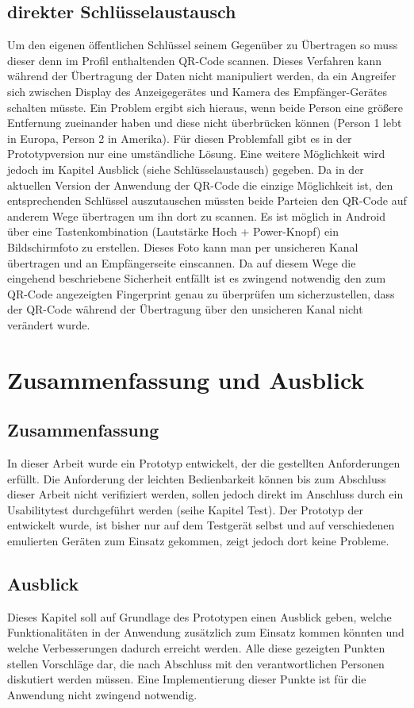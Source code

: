 \documentclass[10pt, a4paper,headsepline]{scrreprt}
\begin{document}
\section{direkter Schlüsselaustausch}
Um den eigenen öffentlichen Schlüssel seinem Gegenüber zu Übertragen so muss dieser denn im Profil enthaltenden QR-Code scannen. Dieses Verfahren kann während der Übertragung der Daten nicht manipuliert werden, da ein Angreifer sich zwischen Display des Anzeigegerätes und Kamera des Empfänger-Gerätes schalten müsste. Ein Problem ergibt sich hieraus, wenn beide Person eine größere Entfernung zueinander haben und diese nicht überbrücken können (Person 1 lebt in Europa, Person 2 in Amerika). Für diesen Problemfall gibt es in der Prototypversion nur eine umständliche Lösung. Eine weitere Möglichkeit wird jedoch im Kapitel Ausblick (siehe Schlüsselaustausch) gegeben. Da in der aktuellen Version der Anwendung der QR-Code die einzige Möglichkeit ist, den entsprechenden Schlüssel auszutauschen müssten beide Parteien den QR-Code auf anderem Wege übertragen um ihn dort zu scannen. Es ist möglich in Android über eine Tastenkombination (Lautstärke Hoch + Power-Knopf) ein Bildschirmfoto zu erstellen. Dieses Foto kann man per unsicheren Kanal übertragen und an Empfängerseite einscannen. Da auf diesem Wege die eingehend beschriebene Sicherheit entfällt ist es zwingend notwendig den zum QR-Code angezeigten Fingerprint genau zu überprüfen um sicherzustellen, dass der QR-Code während der Übertragung über den unsicheren Kanal nicht verändert wurde.

\chapter{Zusammenfassung und Ausblick}
\section{Zusammenfassung}
In dieser Arbeit wurde ein Prototyp entwickelt, der die gestellten Anforderungen erfüllt. Die Anforderung der leichten Bedienbarkeit können bis zum Abschluss dieser Arbeit nicht verifiziert werden, sollen jedoch direkt im Anschluss durch ein Usabilitytest durchgeführt werden (seihe Kapitel Test). Der Prototyp der entwickelt wurde, ist bisher nur auf dem Testgerät selbst und auf verschiedenen emulierten Geräten zum Einsatz gekommen, zeigt jedoch dort keine Probleme. 


\section{Ausblick}
Dieses Kapitel soll auf Grundlage des Prototypen einen Ausblick geben, welche Funktionalitäten in der Anwendung zusätzlich zum Einsatz kommen könnten und welche Verbesserungen dadurch erreicht werden. Alle diese gezeigten Punkten stellen Vorschläge dar, die nach Abschluss mit den verantwortlichen Personen diskutiert werden müssen. Eine Implementierung dieser Punkte ist für die Anwendung nicht zwingend notwendig.
\end{document}
